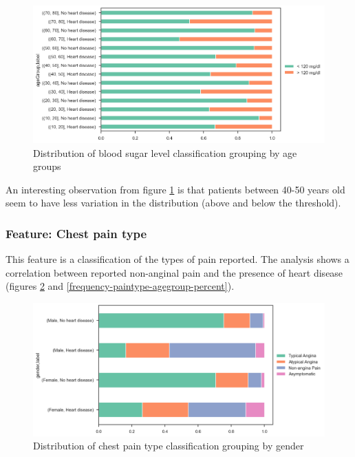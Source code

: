 \begin{figure}[H]
    \caption{Distribution of blood sugar level classification grouping by age groups}\label{frequency-bloodsugar-agegroup-percent}
    \centering
    \includegraphics[width=\linewidth]{media/frequency-08-agegroup-bloodsugar.png}
\end{figure}

An interesting observation from figure \ref{frequency-bloodsugar-agegroup-percent} is that patients between 40-50 years
old seem to have less variation in the distribution (above and below the threshold).

\subsubsection{Feature: Chest pain type}

This feature is a classification of the types of pain reported. The analysis shows a correlation between reported
non-anginal pain and the presence of heart disease (figures \ref{frequency-paintype-gender-percent} and
\ref{frequency-paintype-agegroup-percent}).

\begin{figure}[H]
    \caption{Distribution of chest pain type classification grouping by gender}\label{frequency-paintype-gender-percent}
    \centering
    \includegraphics[width=\linewidth]{media/frequency-09-gender-paintype.png}
\end{figure}

